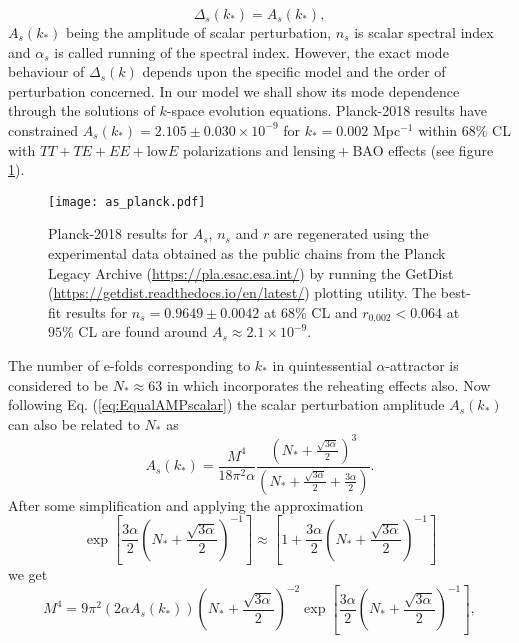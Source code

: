 \documentclass[a4paper,11pt]{article}
\begin{document}
\begin{equation}
    \Delta_s(k_{*})=A_s(k_{*}),
    \label{eq:EqualAMPscalar}
\end{equation}
$A_s(k_{*})$ being the amplitude of scalar perturbation, $n_s$ is scalar spectral index and $\alpha_s$ is called running of the spectral index. However, the exact mode behaviour of $\Delta_s(k)$ depends upon the specific model and the order of perturbation concerned. In our model we shall show its mode dependence through the solutions of $k$-space evolution equations. Planck-2018 results \cite{Planck:2018jri,Planck:2018vyg} have constrained $A_s(k_{*})=2.105\pm 0.030\times 10^{-9}$ for $k_{*}=0.002$ Mpc$^{-1}$ within $68\%$ CL with $TT+TE+EE+\mathrm{low}E$ polarizations and $\mathrm{lensing}+\mathrm{BAO}$ effects (see figure \ref{fig:AmpScalarPerturbation}). 
\begin{figure}[H]
	\centering
	\texttt{[image: as\_planck.pdf]}
	\caption{Planck-2018 results for $A_s$, $n_s$ and $r$ are regenerated using the experimental data obtained as the public chains from the Planck Legacy Archive (\url{https://pla.esac.esa.int/}) by running the GetDist (\url{https://getdist.readthedocs.io/en/latest/}) plotting utility. The best-fit results for $n_s=0.9649\pm 0.0042$ at $68\%$ CL and $r_{0.002}<0.064$ at $95\%$ CL are found around $A_s\approx 2.1\times 10^{-9}$.}
	\label{fig:AmpScalarPerturbation}
\end{figure}
 The number of e-folds corresponding to $k_{*}$ in quintessential $\alpha$-attractor is considered to be $N_{*}\approx 63$ in \cite{Dimopoulos:2017zvq} which incorporates the reheating effects also. Now following Eq. (\ref{eq:EqualAMPscalar}) the scalar perturbation amplitude $A_s(k_{*})$ can also be related to $N_{*}$ as
 \begin{equation}
     A_s(k_{*}) = \frac{M^4}{18\pi^2\alpha}\frac{\left(N_{*}+\frac{\sqrt{3\alpha}}{2}\right)^3}{\left(N_{*}+\frac{\sqrt{3\alpha}}{2}+\frac{3\alpha}{2}\right)}.
 \end{equation}
 After some simplification and applying the approximation 
 \begin{equation}
     \exp\left[\frac{3\alpha}{2}\left(N_{*}+\frac{\sqrt{3\alpha}}{2}\right)^{-1}\right]\approx \left[1+\frac{3\alpha}{2}\left(N_{*}+\frac{\sqrt{3\alpha}}{2}\right)^{-1}\right]
 \end{equation}
 we get
 \begin{equation}
     M^4 = 9\pi^2 (2\alpha A_s(k_{*}))\left(N_{*}+\frac{\sqrt{3\alpha}}{2}\right)^{-2}\exp\left[\frac{3\alpha}{2}\left(N_{*}+\frac{\sqrt{3\alpha}}{2}\right)^{-1}\right],
     \label{eq:COBEnormalization}
 \end{equation}
\end{document}
